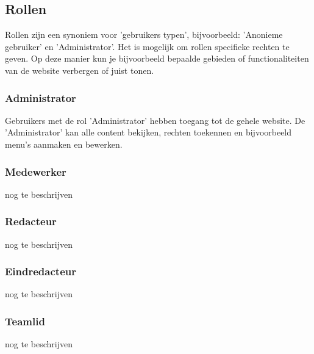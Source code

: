 \subsection{Rollen}\label{rollen}

Rollen zijn een synoniem voor 'gebruikers typen', bijvoorbeeld: 'Anonieme gebruiker' en 'Administrator'.  Het is mogelijk om rollen specifieke rechten te geven. Op deze manier kun je bijvoorbeeld bepaalde gebieden of functionaliteiten van de website verbergen of juist tonen. 

\subsubsection{Administrator}\label{administrator}
Gebruikers met de rol 'Administrator' hebben toegang tot de gehele website. De 'Administrator' kan alle content bekijken, rechten toekennen en bijvoorbeeld menu's aanmaken en bewerken.

\subsubsection{Medewerker}\label{medewerker}
nog te beschrijven

\subsubsection{Redacteur}\label{redacteur}
nog te beschrijven

\subsubsection{Eindredacteur}\label{eindredacteur}
nog te beschrijven

\subsubsection{Teamlid}\label{teamlid}
nog te beschrijven